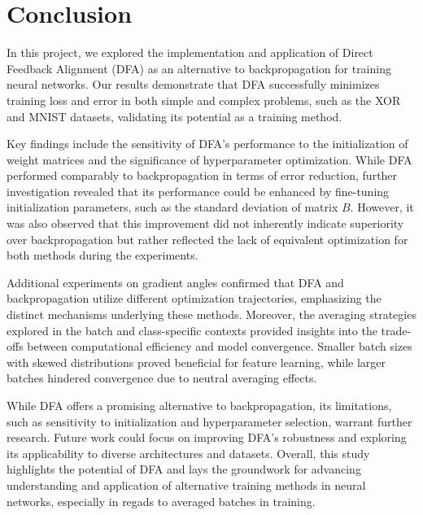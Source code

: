 \documentclass[english]{article}
\begin{document}
\section{Conclusion}
In this project, we explored the implementation and application of Direct Feedback Alignment (DFA) as an alternative to backpropagation for training neural networks. Our results demonstrate that DFA successfully minimizes training loss and error in both simple and complex problems, such as the XOR and MNIST datasets, validating its potential as a training method.

Key findings include the sensitivity of DFA's performance to the initialization of weight matrices and the significance of hyperparameter optimization. While DFA performed comparably to backpropagation in terms of error reduction, further investigation revealed that its performance could be enhanced by fine-tuning initialization parameters, such as the standard deviation of matrix \(B\). However, it was also observed that this improvement did not inherently indicate superiority over backpropagation but rather reflected the lack of equivalent optimization for both methods during the experiments.

Additional experiments on gradient angles confirmed that DFA and backpropagation utilize different optimization trajectories, emphasizing the distinct mechanisms underlying these methods. Moreover, the averaging strategies explored in the batch and class-specific contexts provided insights into the trade-offs between computational efficiency and model convergence. Smaller batch sizes with skewed distributions proved beneficial for feature learning, while larger batches hindered convergence due to neutral averaging effects.

While DFA offers a promising alternative to backpropagation, its limitations, such as sensitivity to initialization and hyperparameter selection, warrant further research. Future work could focus on improving DFA's robustness and exploring its applicability to diverse architectures and datasets. Overall, this study highlights the potential of DFA and lays the groundwork for advancing understanding and application of alternative training methods in neural networks, especially in regads to averaged batches in training.
\end{document}
